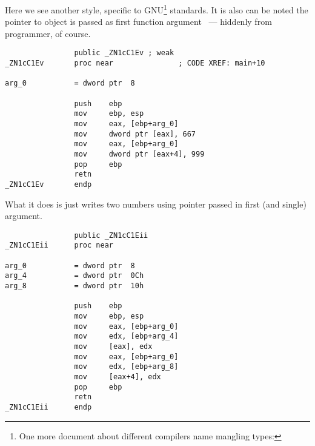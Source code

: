 {Here we see another  style, specific to GNU\footnote{One more document about different compilers name mangling types: \URLAGNER} standards. It is also can be noted the pointer to object is passed as first function argument ~--- hiddenly from programmer, of course.}


\begin{lstlisting}
                public _ZN1cC1Ev ; weak
_ZN1cC1Ev       proc near               ; CODE XREF: main+10

arg_0           = dword ptr  8

                push    ebp
                mov     ebp, esp
                mov     eax, [ebp+arg_0]
                mov     dword ptr [eax], 667
                mov     eax, [ebp+arg_0]
                mov     dword ptr [eax+4], 999
                pop     ebp
                retn
_ZN1cC1Ev       endp
\end{lstlisting}

{What it does is just writes two numbers using pointer passed in first (and single) argument.}


\begin{lstlisting}
                public _ZN1cC1Eii
_ZN1cC1Eii      proc near

arg_0           = dword ptr  8
arg_4           = dword ptr  0Ch
arg_8           = dword ptr  10h

                push    ebp
                mov     ebp, esp
                mov     eax, [ebp+arg_0]
                mov     edx, [ebp+arg_4]
                mov     [eax], edx
                mov     eax, [ebp+arg_0]
                mov     edx, [ebp+arg_8]
                mov     [eax+4], edx
                pop     ebp
                retn
_ZN1cC1Eii      endp
\end{lstlisting}


